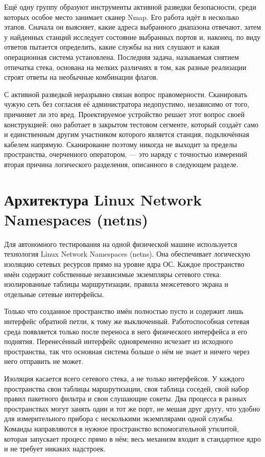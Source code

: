Ещё одну группу образуют инструменты активной разведки безопасности, среди которых особое место занимает сканер Nmap. Его работа идёт в несколько этапов. Сначала он выясняет, какие адреса выбранного диапазона отвечают, затем у найденных станций исследует состояние выбранных портов и, наконец, по виду ответов пытается определить, какие службы на них слушают и какая операционная система установлена. Последняя задача, называемая снятием отпечатка стека, основана на мелких различиях в том, как разные реализации строят ответы на необычные комбинации флагов.

С активной разведкой неразрывно связан вопрос правомерности. Сканировать чужую сеть без согласия её администратора недопустимо, независимо от того, причиняет ли это вред. Проектируемое устройство решает этот вопрос своей конструкцией: оно работает в закрытом тестовом сегменте, который создаёт само и единственным другим участником которого является станция, подключённая кабелем напрямую. Сканирование поэтому никогда не выходит за пределы пространства, очерченного оператором, — это наряду с точностью измерений вторая причина логического разделения, описанного в следующем разделе.

\section{Архитектура Linux Network Namespaces (netns)}
\label{sec:netns_teorie}

Для автономного тестирования на одной физической машине используется технология Linux Network Namespaces (netns). Она обеспечивает логическую изоляцию сетевых ресурсов прямо на уровне ядра ОС. Каждое пространство имён содержит собственные независимые экземпляры сетевого стека: изолированные таблицы маршрутизации, правила межсетевого экрана и отдельные сетевые интерфейсы.

Только что созданное пространство имён полностью пусто и содержит лишь интерфейс обратной петли, к тому же выключенный. Работоспособная сетевая среда появляется только после переноса в него физического интерфейса и его поднятия. Перенесённый интерфейс одновременно исчезает из исходного пространства, так что основная система больше о нём не знает и ничего через него отправить не может.

Изоляция касается всего сетевого стека, а не только интерфейсов. У каждого пространства свои таблицы маршрутизации, своя таблица соседей, свой набор правил пакетного фильтра и свои слушающие сокеты. Два процесса в разных пространствах могут занять один и тот же порт, не мешая друг другу, что удобно для измерительного прибора с несколькими экземплярами одной службы. Команды направляются в нужное пространство вспомогательной утилитой, которая запускает процесс прямо в нём; весь механизм входит в стандартное ядро и не требует никаких надстроек.

